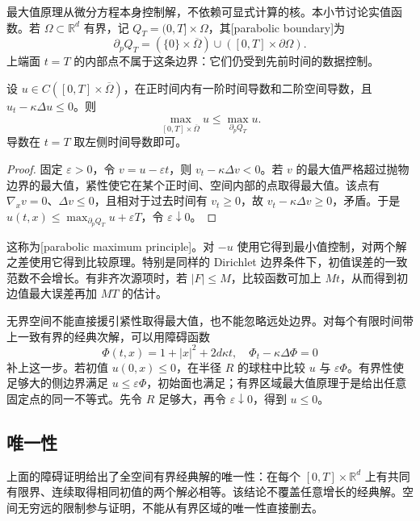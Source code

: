 最大值原理从微分方程本身控制解，不依赖可显式计算的核。本小节讨论实值函数。若 \(\Omega\subset\mathbb R^d\) 有界，记 \(Q_T=(0,T]\times\Omega\)，其[parabolic boundary]为
\[
 \partial_pQ_T=(\{0\}\times\overline\Omega)
 \cup([0,T]\times\partial\Omega).
\]
上端面 \(t=T\) 的内部点不属于这条边界：它们仍受到先前时间的数据控制。

\begin{theorem}[抛物最大值原理]\label{b2:thm:12-maximum}
设 \(u\in C([0,T]\times\overline\Omega)\)，在正时间内有一阶时间导数和二阶空间导数，且 \(u_t-\kappa\Delta u\leq0\)。则
\[
 \max_{[0,T]\times\overline\Omega}u
 \leq\max_{\partial_pQ_T}u.
\]
导数在 \(t=T\) 取左侧时间导数即可。
\end{theorem}
\begin{proof}
固定 \(\varepsilon>0\)，令 \(v=u-\varepsilon t\)，则 \(v_t-\kappa\Delta v<0\)。若 \(v\) 的最大值严格超过抛物边界的最大值，紧性使它在某个正时间、空间内部的点取得最大值。该点有 \(\nabla_xv=0\)、\(\Delta v\leq0\)，且相对于过去时间有 \(v_t\geq0\)，故 \(v_t-\kappa\Delta v\geq0\)，矛盾。于是 \(u(t,x)\leq\max_{\partial_pQ_T}u+\varepsilon T\)，令 \(\varepsilon\downarrow0\)。
\end{proof}

这称为[parabolic maximum principle]。对 \(-u\) 使用它得到最小值控制，对两个解之差使用它得到比较原理。特别是同样的 Dirichlet 边界条件下，初值误差的一致范数不会增长。有非齐次源项时，若 \(|F|\leq M\)，比较函数可加上 \(Mt\)，从而得到初边值最大误差再加 \(MT\) 的估计。

\ProseParagraphBreak

无界空间不能直接援引紧性取得最大值，也不能忽略远处边界。对每个有限时间带上一致有界的经典次解，可以用障碍函数
\[
 \Phi(t,x)=1+|x|^2+2d\kappa t,
 \quad\Phi_t-\kappa\Delta\Phi=0
\]
补上这一步。若初值 \(u(0,x)\leq0\)，在半径 \(R\) 的球柱中比较 \(u\) 与 \(\varepsilon\Phi\)。有界性使足够大的侧边界满足 \(u\leq\varepsilon\Phi\)，初始面也满足；有界区域最大值原理于是给出任意固定点的同一不等式。先令 \(R\) 足够大，再令 \(\varepsilon\downarrow0\)，得到 \(u\leq0\)。

\subsection{唯一性}
\label{b2:subsec:120303}

上面的障碍证明给出了全空间有界经典解的唯一性：在每个 \([0,T]\times\mathbb R^d\) 上有共同有限界、连续取得相同初值的两个解必相等。该结论不覆盖任意增长的经典解。空间无穷远的限制参与证明，不能从有界区域的唯一性直接删去。

